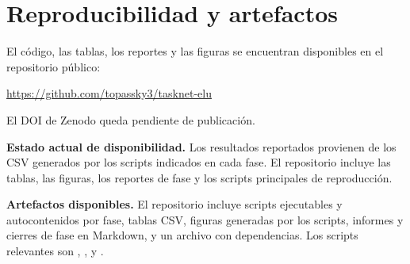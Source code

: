 \section{Reproducibilidad y artefactos}

El c\'odigo, las tablas, los reportes y las figuras se encuentran disponibles en el repositorio p\'ublico:

\begin{center}
\url{https://github.com/topassky3/tasknet-elu}
\end{center}

El DOI de Zenodo queda pendiente de publicaci\'on.

\textbf{Estado actual de disponibilidad.} Los resultados reportados provienen de los CSV generados por los scripts indicados en cada fase. El repositorio incluye las tablas, las figuras, los reportes de fase y los scripts principales de reproducci\'on.

\textbf{Artefactos disponibles.} El repositorio incluye scripts ejecutables y autocontenidos por fase, tablas CSV, figuras generadas por los scripts, informes y cierres de fase en Markdown, y un archivo  con dependencias. Los scripts relevantes son , ,  y .


